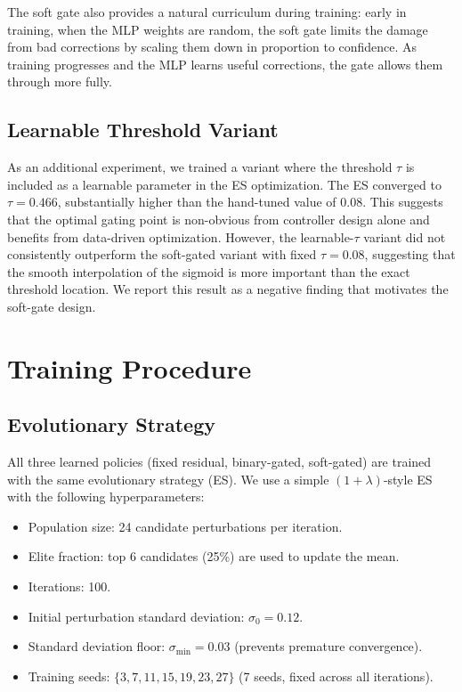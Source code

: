 \documentclass[journal]{IEEEtran}
\begin{document}
The soft gate also provides a natural curriculum during training: early in training,
when the MLP weights are random, the soft gate limits the damage from bad corrections
by scaling them down in proportion to confidence. As training progresses and the MLP
learns useful corrections, the gate allows them through more fully.

\subsection{Learnable Threshold Variant}
\label{sec:learnable}

As an additional experiment, we trained a variant where the threshold $\tau$ is
included as a learnable parameter in the ES optimization. The ES converged to
$\tau = 0.466$, substantially higher than the hand-tuned value of 0.08. This suggests
that the optimal gating point is non-obvious from controller design alone and benefits
from data-driven optimization. However, the learnable-$\tau$ variant did not
consistently outperform the soft-gated variant with fixed $\tau = 0.08$, suggesting
that the smooth interpolation of the sigmoid is more important than the exact threshold
location. We report this result as a negative finding that motivates the soft-gate
design.


\section{Training Procedure}
\label{sec:training}

\subsection{Evolutionary Strategy}

All three learned policies (fixed residual, binary-gated, soft-gated) are trained
with the same evolutionary strategy (ES). We use a simple $(1 + \lambda)$-style ES
with the following hyperparameters:
\begin{itemize}
  \item Population size: 24 candidate perturbations per iteration.
  \item Elite fraction: top 6 candidates (25\%) are used to update the mean.
  \item Iterations: 100.
  \item Initial perturbation standard deviation: $\sigma_0 = 0.12$.
  \item Standard deviation floor: $\sigma_{\min} = 0.03$ (prevents premature convergence).
  \item Training seeds: $\{3, 7, 11, 15, 19, 23, 27\}$ (7 seeds, fixed across all iterations).
\end{itemize}
\end{document}
